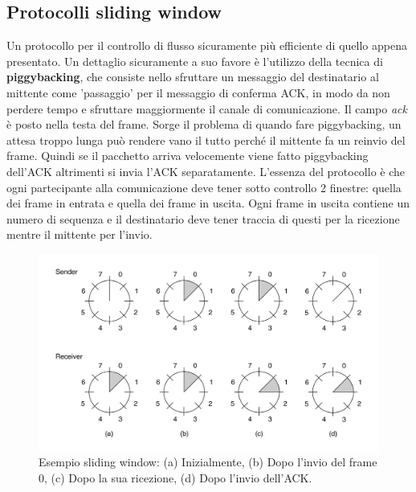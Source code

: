 \subsection{Protocolli sliding window}
Un protocollo per il controllo di flusso sicuramente più efficiente di quello appena presentato. Un dettaglio sicuramente a suo favore è l'utilizzo della tecnica di \textbf{piggybacking}, che consiste nello sfruttare un messaggio del destinatario al mittente come 'passaggio' per il messaggio di conferma ACK, in modo da non perdere tempo e sfruttare maggiormente il canale di comunicazione. Il campo \textit{ack} è posto nella testa del frame. Sorge il problema di quando fare piggybacking, un attesa troppo lunga può rendere vano il tutto perché il mittente fa un reinvio del frame. Quindi se il pacchetto arriva velocemente viene fatto piggybacking dell'ACK altrimenti si invia l'ACK separatamente. L'essenza del protocollo è che ogni partecipante alla comunicazione deve tener sotto controllo 2 finestre: quella dei frame in entrata e quella dei frame in uscita. Ogni frame in uscita contiene un numero di sequenza e il destinatario deve tener traccia di questi per la ricezione mentre il mittente per l'invio. 
\begin{figure}[htbp]
\centering
\includegraphics[scale=0.7]{images/sw.jpg}
\caption{Esempio sliding window: (a) Inizialmente, (b) Dopo l'invio del frame 0, (c) Dopo la sua ricezione, (d) Dopo l'invio dell'ACK.}
\end{figure}

